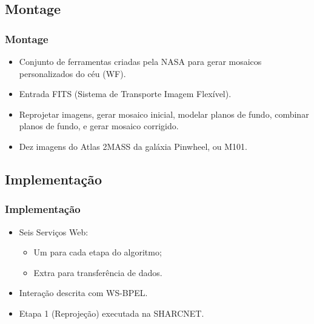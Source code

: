 \documentclass[red, cover=invisible, theme=Warsaw]{myslides}
\begin{document}
    \subsection{Montage}
	\begin{frame} \frametitle{Montage}
	    \begin{itemize}
		\item Conjunto de ferramentas criadas pela NASA para gerar mosaicos personalizados do céu (WF).
		\item Entrada FITS (Sistema de Transporte Imagem Flexível).
		\item Reprojetar imagens, gerar mosaico inicial, modelar planos de fundo, combinar planos de fundo, e gerar mosaico corrigido.
		\item Dez imagens do Atlas 2MASS da galáxia Pinwheel, ou M101.
	    \end{itemize}
	\end{frame}  
    
    \subsection{Implementação}
	\begin{frame} \frametitle{Implementação}
	    \begin{itemize}
		\item Seis Serviços Web:
		    \begin{itemize}
			\item Um para cada etapa do algoritmo;
			\item Extra para transferência de dados.
		    \end{itemize}
		\item Interação descrita com WS-BPEL.
		\item Etapa 1 (Reprojeção) executada na SHARCNET.
	    \end{itemize}
	\end{frame}
	
\end{document}
